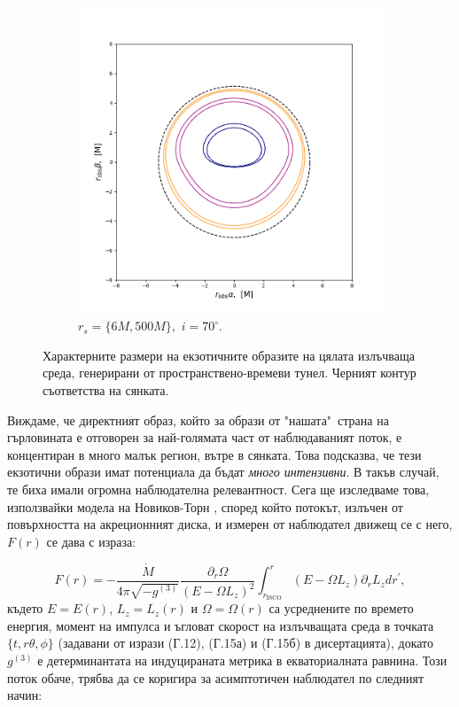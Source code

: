 \documentclass[12pt]{article}
\numberwithin{equation}{section}
\numberwithin{figure}{section}
\begin{document}
\begin{figure}[!htb]
\begin{subfigure}{6cm}
			\includegraphics[scale = 0.35]{Section_6_Morphology_of_the images_of_horizonless_spacetimes/WH_70_deg_r6_r500.png}
			\caption{$r_s = \{6M, 500M\},\,\, i = 70^\circ$.}
		\end{subfigure}
		\caption[Характерните размери на екзотичните образите на цялата излъчваща среда, генерирани от пространствено-времеви тунел.]{\small Характерните размери на екзотичните образите на цялата излъчваща среда, генерирани от пространствено-времеви тунел. Черният контур съответства на сянката.} 
		\label{WH_img_size_deg}
	\end{figure}
	
	Виждаме, че директният образ, който за образи от "нашата"$\,$ страна на гърловината е отговорен за най-голямата част от наблюдаваният поток, е концентиран в много малък регион, вътре в сянката. Това подсказва, че тези екзотични образи имат потенциала да бъдат \emph{много интензивни}. В такъв случай, те биха имали огромна наблюдателна релевантност. Сега ще изследваме това, използвайки модела на Новиков-Торн \cite{Page1973}, според който потокът, излъчен от повърхността на акреционният диска, и измерен от наблюдател движещ се с него, $F(r)$ се дава с израза:
		
	\begin{equation}
		F(r) = - \frac{\dot{M}}{4\pi\sqrt{-g^{(3)}}}\frac{\partial_r\Omega}{\left(E - \Omega L_z\right)^2}\int_{r_\text{ISCO}}^r \left(E - \Omega L_z\right)\partial_rL_zdr^\prime,
	\end{equation}
	където $E = E(r)$, $L_z = L_z(r)$ и $\Omega = \Omega(r)$ са усреднените по времето енергия, момент на импулса и ъгловат скорост на излъчващата среда в точката $\{t,r\theta,\phi\}$ (задавани от изрази (Г.12), (Г.15а) и (Г.15б) в дисертацията), докато $g^{(3)}$ е детерминантата на индуцираната метрика в екваториалната равнина. Този поток обаче, трябва да се коригира за асимптотичен наблюдател по следният начин:
	
\end{document}
